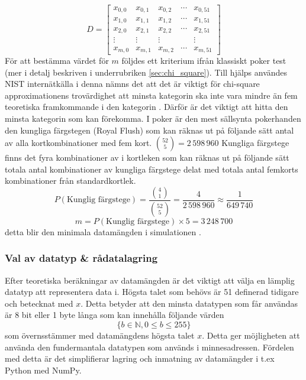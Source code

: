 \documentclass[swedish,a4paper]{article}
\begin{document}

\begin{equation*}
	D = \begin{bmatrix}
		x_{0,0} & x_{0,1} & x_{0,2} & \cdots & x_{0,51}\\ 
		x_{1,0} & x_{1,1} & x_{1,2} & \cdots & x_{1,51}\\
		x_{2,0} & x_{2,1} & x_{2,2} & \cdots & x_{2,51}\\
		\vdots & \vdots & \vdots & \; & \vdots \\
		x_{m,0} & x_{m,1} & x_{m,2} & \cdots & x_{m,51}
	\end{bmatrix}
\end{equation*}
För att bestämma värdet för $m$ följdes ett kriterium ifrån klassiskt
poker test (mer i  detalj beskriven i underrubriken
\ref{sec:chi_square}).
Till hjälps användes NIST internätkälla   i
denna nämns det att det är viktigt för chi-square approximationens trovärdighet
att minsta kategorin ska inte vara mindre än fem teoretiska framkommande i den
kategorin \parencite{nist}. Därför är det
viktigt att hitta den minsta kategorin som kan förekomma. I poker är den mest
sällsynta pokerhanden den kungliga färgstegen (Royal Flush) som kan räknas ut på
följande sätt antal av alla kortkombinationer med fem kort. $\binom{52}{5} =
2\,598\,960$ Kungliga färgstege finns det fyra  kombinationer av i kortleken
som kan räknas ut på följande sätt totala antal kombinationer av kungliga
färgstege delat med totala antal femkorts kombinationer från standardkortlek.
$$ P(\text{Kunglig färgstege}) =  \frac{\binom{4}{1}}{\binom{52}{5}} =
\frac{4}{2\,598\,960} \approx \frac{1}{649\,740} $$ $$m = P(\text{Kunglig
färgstege})  \times 5 = 3\,248\,700$$ detta blir den minimala datamängden i simulationen
.

\subsubsection{Val av datatyp \& rådatalagring} 
Efter teoretiska beräkningar av
datamängden är det viktigt att välja en lämplig datatyp att representera data i.
Högsta talet som behövs är 51 definerad tidigare och betecknat med $x$. Detta
betyder att den minsta datatypen som får användas är 8 bit eller 1 byte långa som
kan  innehålla följande värden $$\{b \in \mathbb{N},  0 \leq b \leq 255 \}$$ som
överns\-stämmer med datamängdens högsta talet $x$. Detta ger möjligheten att
använda den  fundermantala datatypen som används i minnesadressen. Fördelen med
detta är det simplifierar lagring och inmatning av datamängder i t.ex Python
med NumPy.
\end{document}
